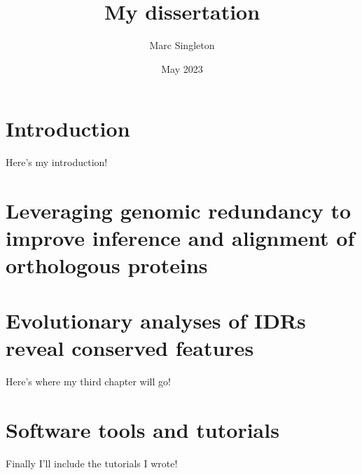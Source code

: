 \documentclass[11pt,letterpaper,oneside]{book}
\begin{document}
\title{My dissertation}
\author{Marc Singleton}
\date{May 2023}
\maketitle

\tableofcontents

\chapter{Introduction}
\graphicspath{{introduction/figures/}}
Here's my introduction!

\lipsum[1-5]

\chapter{Leveraging genomic redundancy to improve inference and alignment of orthologous proteins}
\graphicspath{{chapter1/figures/}}

\clearpage


\chapter{Evolutionary analyses of IDRs reveal conserved features}
Here's where my third chapter will go!

\lipsum[6-8]

\chapter{Software tools and tutorials}
Finally I'll include the tutorials I wrote!

\lipsum[9-10]

\printbibliography[heading=bibintoc]
\end{document}
